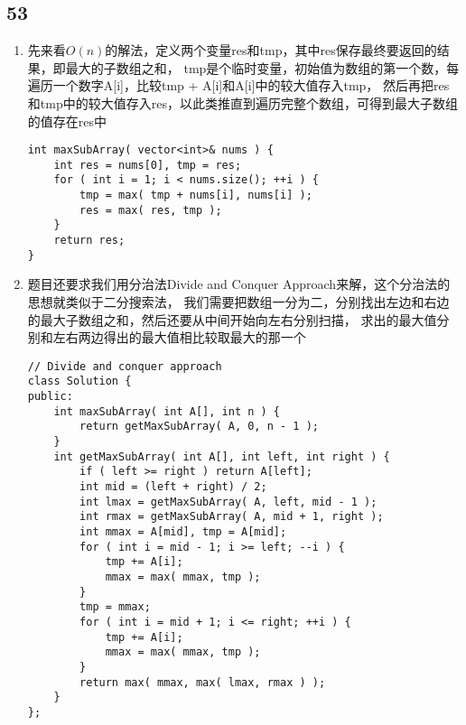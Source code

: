 \documentclass[12pt,a4paper]{article}
\begin{document}
\subsection{53}
\begin{enumerate}
\item
\begin{CJK}{UTF8}{gbsn}
先来看$O(n)$的解法，定义两个变量res和tmp，其中res保存最终要返回的结果，即最大的子数组之和，
tmp是个临时变量，初始值为数组的第一个数，每遍历一个数字A[i]，比较tmp + A[i]和A[i]中的较大值存入tmp，
然后再把res和tmp中的较大值存入res，以此类推直到遍历完整个数组，可得到最大子数组的值存在res中
\end{CJK}
\begin{lstlisting}
int maxSubArray( vector<int>& nums ) {
	int res = nums[0], tmp = res;
	for ( int i = 1; i < nums.size(); ++i ) {
		tmp = max( tmp + nums[i], nums[i] );
		res = max( res, tmp );
	}
	return res;
}
\end{lstlisting}
\item
\begin{CJK}{UTF8}{gbsn}
题目还要求我们用分治法Divide and Conquer Approach来解，这个分治法的思想就类似于二分搜索法，
我们需要把数组一分为二，分别找出左边和右边的最大子数组之和，然后还要从中间开始向左右分别扫描，
求出的最大值分别和左右两边得出的最大值相比较取最大的那一个
\end{CJK}
\begin{lstlisting}
// Divide and conquer approach
class Solution {
public:
	int maxSubArray( int A[], int n ) {
		return getMaxSubArray( A, 0, n - 1 );
	}
	int getMaxSubArray( int A[], int left, int right ) {
		if ( left >= right ) return A[left];
		int mid = (left + right) / 2;
		int lmax = getMaxSubArray( A, left, mid - 1 );
		int rmax = getMaxSubArray( A, mid + 1, right );
		int mmax = A[mid], tmp = A[mid];
		for ( int i = mid - 1; i >= left; --i ) {
			tmp += A[i];
			mmax = max( mmax, tmp );
		}
		tmp = mmax;
		for ( int i = mid + 1; i <= right; ++i ) {
			tmp += A[i];
			mmax = max( mmax, tmp );
		}
		return max( mmax, max( lmax, rmax ) );
	}
};
\end{lstlisting}
\end{enumerate}
\end{document}
